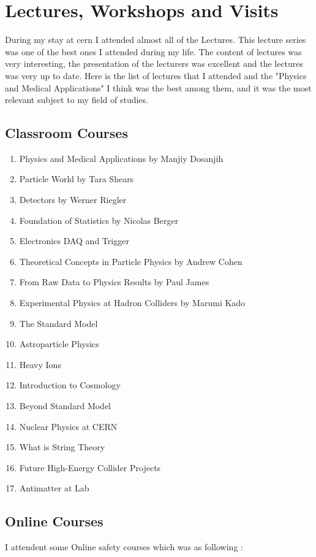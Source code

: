 \documentclass[12pt,a4paper]{article}
\begin{document}
\section{Lectures, Workshops and Visits}
During my stay at cern I attended almost all of the Lectures. This lecture series was one of the best ones I attended during my life. The content of lectures was very interesting, the presentation of the lecturers was excellent and the lectures was very up to date. Here is the list of lectures that I attended and the "Physics and Medical Applications" I think was the best among them, and it was the most relevant subject to my field of studies.
\subsection{Classroom Courses}

\begin{enumerate}

\item Physics and Medical Applications by Manjiy Dosanjih
\item Particle World by Tara Shears
\item Detectors by Werner Riegler
\item Foundation of Statistics by Nicolas Berger
\item Electronics DAQ and Trigger
\item Theoretical Concepts in Particle Physics by Andrew Cohen
\item From Raw Data to Physics Results by Paul James
\item Experimental Physics at Hadron Colliders by Marumi Kado
\item The Standard Model
\item Astroparticle Physics
\item Heavy Ions
\item Introduction to Cosmology
\item Beyond Standard Model
\item Nuclear Physics at CERN
\item What is String Theory
\item Future High-Energy Collider Projects
\item Antimatter at Lab

\end{enumerate}


\subsection{Online Courses}
I attendent some Online safety courses which was as following :
\end{document}
